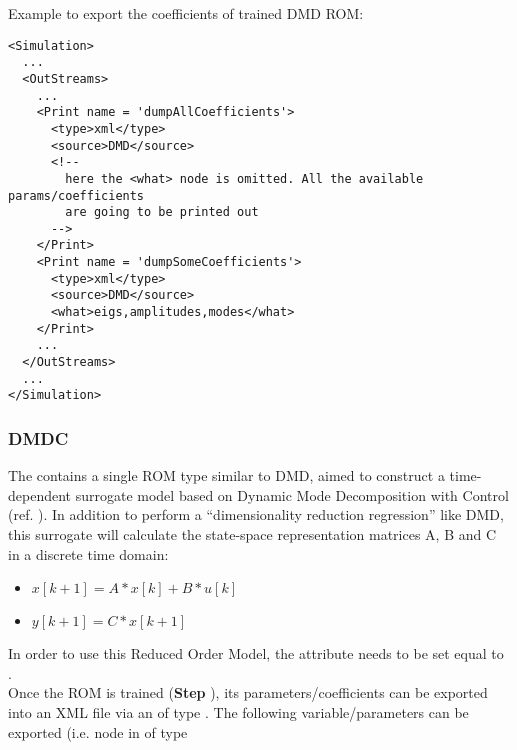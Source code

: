 Example to export the coefficients of trained DMD ROM:
\begin{lstlisting}[style=XML,morekeywords={name,subType}]
<Simulation>
  ...
  <OutStreams>
    ...
    <Print name = 'dumpAllCoefficients'>
      <type>xml</type>
      <source>DMD</source>
      <!--
        here the <what> node is omitted. All the available params/coefficients
        are going to be printed out
      -->
    </Print>
    <Print name = 'dumpSomeCoefficients'>
      <type>xml</type>
      <source>DMD</source>
      <what>eigs,amplitudes,modes</what>
    </Print>
    ...
  </OutStreams>
  ...
</Simulation>
\end{lstlisting}


\subsubsection{DMDC}
  The  contains a single ROM type similar to DMD, aimed to         construct a time-
  dependent surrogate model based on Dynamic         Mode Decomposition with Control (ref.
  \cite{proctor2016dynamic}).         In addition to perform a ``dimensionality reduction
  regression'' like DMD, this surrogate will         calculate the state-space representation
  matrices A, B and  C in a discrete time domain:         \begin{itemize}           \item
  $x[k+1]=A*x[k]+B*u[k]$           \item $y[k+1]=C*x[k+1]$         \end{itemize}          In order
  to use this Reduced Order Model, the  attribute          needs to be
  set equal to .         \\         Once the ROM  is trained (\textbf{Step}
  ), its         parameters/coefficients can be exported into an XML file
  via an  of type . The following variable/parameters can be
  exported (i.e.          node         in  of type
